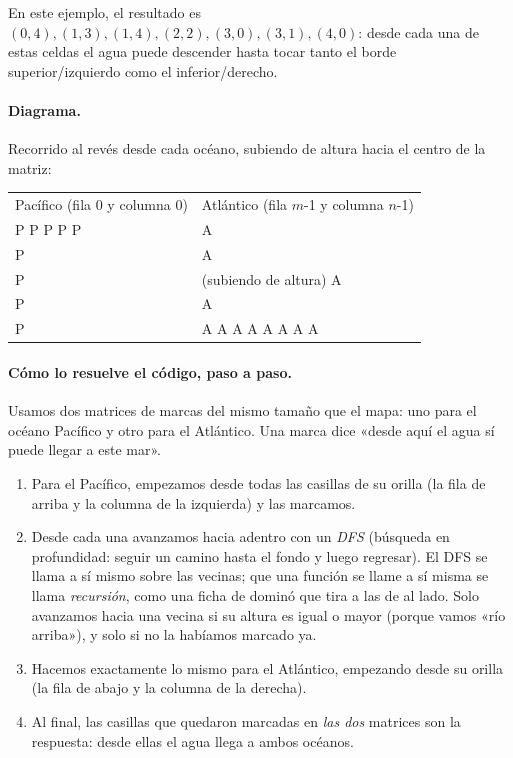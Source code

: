 \noindent En este ejemplo, el resultado es
$(0,4), (1,3), (1,4), (2,2), (3,0), (3,1), (4,0)$: desde cada una de estas
celdas el agua puede descender hasta tocar tanto el borde superior/izquierdo
como el inferior/derecho.

\paragraph{Diagrama.} Recorrido al revés desde cada océano, subiendo de altura
hacia el centro de la matriz:

\begin{center}
\ttfamily
\begin{tabular}{ll}
Pacífico (fila 0 y columna 0) & Atlántico (fila $m$-1 y columna $n$-1)\\
P P P P P & \phantom{A A A A} A\\
P \phantom{P P P} & \phantom{A A A A} A\\
P \phantom{P P P} & (subiendo de altura) \phantom{AA} A\\
P \phantom{P P P} & \phantom{A A A A} A\\
P \phantom{P P P} & A A A A A A A A\\
\end{tabular}
\end{center}

\paragraph{Cómo lo resuelve el código, paso a paso.} Usamos dos matrices de
marcas del mismo tamaño que el mapa: uno para el océano Pacífico y otro para el
Atlántico. Una marca dice «desde aquí el agua sí puede llegar a este mar».
\begin{enumerate}
  \item Para el Pacífico, empezamos desde todas las casillas de su orilla (la
        fila de arriba y la columna de la izquierda) y las marcamos.
  \item Desde cada una avanzamos hacia adentro con un \emph{DFS} (búsqueda en
        profundidad: seguir un camino hasta el fondo y luego regresar). El DFS
        se llama a sí mismo sobre las vecinas; que una función se llame a sí
        misma se llama \emph{recursión}, como una ficha de dominó que tira a las
        de al lado. Solo avanzamos hacia una vecina si su altura es igual o
        mayor (porque vamos «río arriba»), y solo si no la habíamos marcado ya.
  \item Hacemos exactamente lo mismo para el Atlántico, empezando desde su
        orilla (la fila de abajo y la columna de la derecha).
  \item Al final, las casillas que quedaron marcadas en \emph{las dos} matrices
        son la respuesta: desde ellas el agua llega a ambos océanos.
\end{enumerate}

